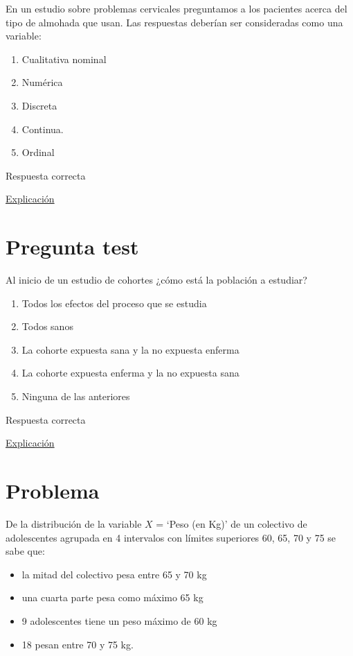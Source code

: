 \documentclass[
]{book}
\providecommand{\tightlist}{%
  \setlength{\itemsep}{0pt}\setlength{\parskip}{0pt}}
\begin{document}
En un estudio sobre problemas cervicales preguntamos a los pacientes acerca del tipo de almohada que usan. Las respuestas deberían ser consideradas como una variable:

\begin{enumerate}
\def\labelenumi{\alph{enumi})}
\tightlist
\item
  Cualitativa nominal
\item
  Numérica
\item
  Discreta
\item
  Continua.
\item
  Ordinal
\end{enumerate}

Respuesta correcta

\href{https://1fjmanzano.github.io/bioestadistica/tipos-de-variables.html}{Explicación}

\hypertarget{pregunta-test-12}{%
\section{Pregunta test}\label{pregunta-test-12}}

Al inicio de un estudio de cohortes ¿cómo está la población a estudiar?

\begin{enumerate}
\def\labelenumi{\alph{enumi})}
\tightlist
\item
  Todos los efectos del proceso que se estudia
\item
  Todos sanos
\item
  La cohorte expuesta sana y la no expuesta enferma
\item
  La cohorte expuesta enferma y la no expuesta sana
\item
  Ninguna de las anteriores
\end{enumerate}

Respuesta correcta

\href{https://es.wikipedia.org/wiki/Estudio_de_cohorte}{Explicación}

\hypertarget{problema-2}{%
\section{Problema}\label{problema-2}}

De la distribución de la variable \(X\) = `Peso (en Kg)' de un colectivo de adolescentes agrupada en 4 intervalos con límites superiores 60, 65, 70 y 75 se sabe que:

\begin{itemize}
\tightlist
\item
  la mitad del colectivo pesa entre 65 y 70 kg
\item
  una cuarta parte pesa como máximo 65 kg
\item
  9 adolescentes tiene un peso máximo de 60 kg
\item
  18 pesan entre 70 y 75 kg.
\end{itemize}
\end{document}
